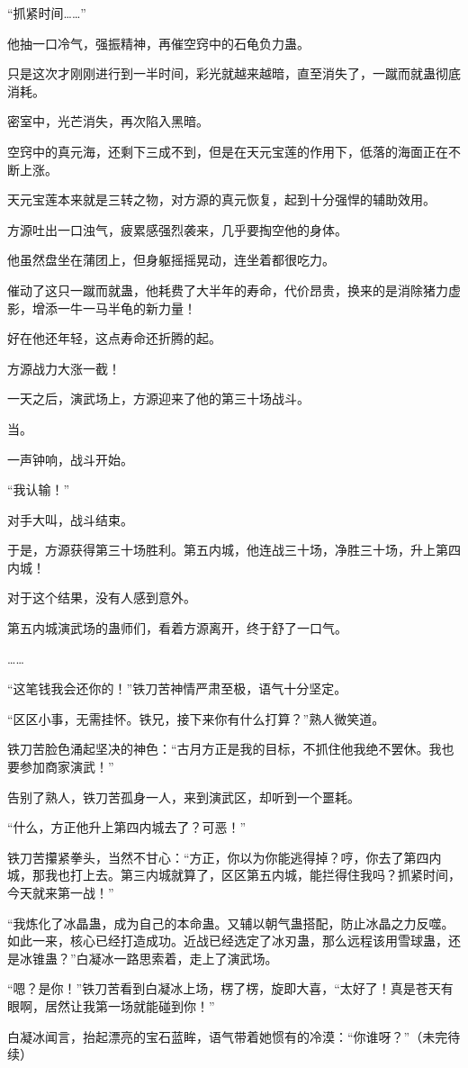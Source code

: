 \begin{this_body}
“抓紧时间……”

他抽一口冷气，强振精神，再催空窍中的石龟负力蛊。

只是这次才刚刚进行到一半时间，彩光就越来越暗，直至消失了，一蹴而就蛊彻底消耗。

密室中，光芒消失，再次陷入黑暗。

空窍中的真元海，还剩下三成不到，但是在天元宝莲的作用下，低落的海面正在不断上涨。

天元宝莲本来就是三转之物，对方源的真元恢复，起到十分强悍的辅助效用。

方源吐出一口浊气，疲累感强烈袭来，几乎要掏空他的身体。

他虽然盘坐在蒲团上，但身躯摇摇晃动，连坐着都很吃力。

催动了这只一蹴而就蛊，他耗费了大半年的寿命，代价昂贵，换来的是消除猪力虚影，增添一牛一马半龟的新力量！

好在他还年轻，这点寿命还折腾的起。

方源战力大涨一截！

一天之后，演武场上，方源迎来了他的第三十场战斗。

当。

一声钟响，战斗开始。

“我认输！”

对手大叫，战斗结束。

于是，方源获得第三十场胜利。第五内城，他连战三十场，净胜三十场，升上第四内城！

对于这个结果，没有人感到意外。

第五内城演武场的蛊师们，看着方源离开，终于舒了一口气。

……

“这笔钱我会还你的！”铁刀苦神情严肃至极，语气十分坚定。

“区区小事，无需挂怀。铁兄，接下来你有什么打算？”熟人微笑道。

铁刀苦脸色涌起坚决的神色：“古月方正是我的目标，不抓住他我绝不罢休。我也要参加商家演武！”

告别了熟人，铁刀苦孤身一人，来到演武区，却听到一个噩耗。

“什么，方正他升上第四内城去了？可恶！”

铁刀苦攥紧拳头，当然不甘心：“方正，你以为你能逃得掉？哼，你去了第四内城，那我也打上去。第三内城就算了，区区第五内城，能拦得住我吗？抓紧时间，今天就来第一战！”

“我炼化了冰晶蛊，成为自己的本命蛊。又辅以朝气蛊搭配，防止冰晶之力反噬。如此一来，核心已经打造成功。近战已经选定了冰刃蛊，那么远程该用雪球蛊，还是冰锥蛊？”白凝冰一路思索着，走上了演武场。

“嗯？是你！”铁刀苦看到白凝冰上场，楞了楞，旋即大喜，“太好了！真是苍天有眼啊，居然让我第一场就能碰到你！”

白凝冰闻言，抬起漂亮的宝石蓝眸，语气带着她惯有的冷漠：“你谁呀？”（未完待续）

\end{this_body}

